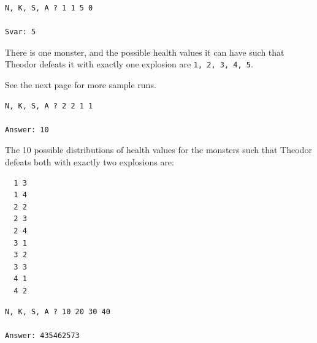\begin{verbatim}
N, K, S, A ? 1 1 5 0

Svar: 5
\end{verbatim}
 There is one monster, and the possible health values it can have such that Theodor defeats it with exactly one explosion are \verb+1, 2, 3, 4, 5+.

See the next page for more sample runs.

\newpage

\begin{verbatim}
N, K, S, A ? 2 2 1 1

Answer: 10
\end{verbatim}
 The 10 possible distributions of health values for the monsters such that Theodor defeats both with exactly two explosions are:
\begin{verbatim}
  1 3
  1 4
  2 2
  2 3
  2 4
  3 1
  3 2
  3 3
  4 1
  4 2
\end{verbatim}

\vspace{1cm}
\begin{verbatim}
N, K, S, A ? 10 20 30 40

Answer: 435462573
\end{verbatim}


